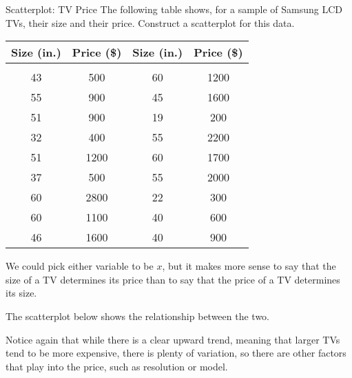 \begin{example}{Scatterplot: TV Price}
The following table shows, for a sample of Samsung LCD TVs, their size and their price.  Construct a scatterplot for this data.
\begin{center}
\begin{tabular}{c c | c c}
Size (in.) & Price (\$) & Size (in.) & Price (\$)\\
\hline
\\
43 & 500 & 60 & 1200\\
55 & 900 & 45 & 1600\\
51 & 900 & 19 & 200\\
32 & 400 & 55 & 2200\\
51 & 1200 & 60 & 1700\\
37 & 500 & 55 & 2000\\
60 & 2800 & 22 & 300\\
60 & 1100 & 40 & 600\\
46 & 1600 & 40 & 900
\end{tabular}
\end{center}

\sol
We could pick either variable to be $x$, but it makes more sense to say that the size of a TV determines its price than to say that the price of a TV determines its size.

The scatterplot below shows the relationship between the two.
\begin{center}
\end{center}
\end{example}

Notice again that while there is a clear upward trend, meaning that larger TVs tend to be more expensive, there is plenty of variation, so there are other factors that play into the price, such as resolution or model.

